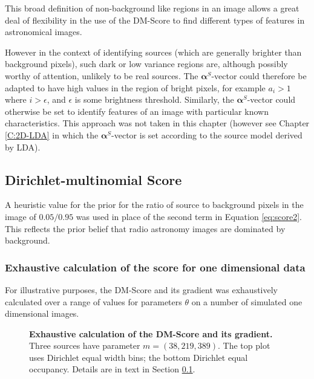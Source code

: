 This broad definition of non-background like regions in an image allows a great deal of flexibility in the use of the DM-Score to find different types of features in astronomical images.

However in the context of identifying sources (which are generally brighter than background pixels), such dark or low variance regions are, although possibly worthy of attention, unlikely to be real sources. The $\boldsymbol{\alpha}^S$-vector could therefore be adapted to have high values in the region of bright pixels, for example $a_i > 1$ where $i > \epsilon$, and $\epsilon$ is some brightness threshold. Similarly, the $\boldsymbol{\alpha}^S$-vector could otherwise be set to identify features of an image with particular known characteristics. This approach was not taken in this chapter (however see Chapter \ref{C:2D-LDA} in which the $\boldsymbol{\alpha}^S$-vector is set according to the source model derived by LDA).

\subsection{Dirichlet-multinomial Score}\label{sec:meth-score}

A heuristic value for the prior for the ratio of source to background pixels in the image of $0.05/0.95$ was used in place of the second term in Equation \ref{eq:score2}. This reflects the prior belief that radio astronomy images are dominated by background.

\subsubsection{Exhaustive calculation of the score for one dimensional data}

For illustrative purposes, the DM-Score and its gradient was exhaustively calculated over a range of values for parameters $\theta$ on a number of simulated one dimensional images.

\begin{figure}
\centering
{}
\caption[Exhaustive calculation of the DM-Score and its gradient (1)]{\textbf{Exhaustive calculation of the DM-Score and its gradient.} Three sources have parameter $m = (38, 219, 389)$. The top plot uses Dirichlet equal width bins; the bottom Dirichlet equal occupancy. Details are in text in Section \ref{sec:meth-score}.}
\label{fig:1d-score-egs1}
\end{figure}

